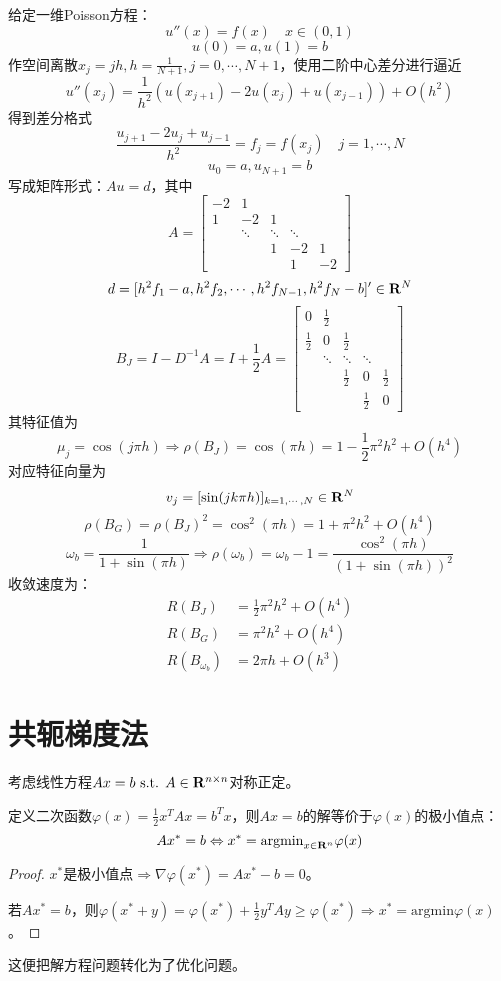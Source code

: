 \documentclass{ctexart}
\begin{document}
\begin{Eg}[一维Poisson方程边值问题的差分格式]
给定一维Poisson方程：
\[u''(x)=f(x)\quad x\in (0,1)\]
\[u(0)=a,u(1)=b\]
作空间离散$x_j=jh,h=\frac{1}{N+1},j=0,\cdots, N+1$，使用二阶中心差分进行逼近
\[u''(x_j)=\frac{1}{h^2}(u(x_{j+1})-2u(x_j)+u(x_{j-1}))+O(h^2)\]
得到差分格式
\[\frac{u_{j+1}-2u_j+u_{j-1}}{h^2}=f_j=f(x_j)\quad j=1,\cdots,N\]
\[u_0=a, u_{N+1}=b\]
写成矩阵形式：$Au=d$，其中
\[A=
\begin{bmatrix}
-2&1&&&\\
1&-2&1&&\\
&\ddots&\ddots&\ddots&\\
&&1&-2&1\\
&&&1&-2
\end{bmatrix}
\]
\[d=[h^2f_1-a,h^2f_2,\cdots, h^2f_{N-1},h^2f_N-b]'\in\mathbf{R}^N\]
\[B_J=I-D^{-1}A=I+\frac{1}{2}A=
\begin{bmatrix}
0&\frac{1}{2}&&&\\
\frac{1}{2}&0&\frac{1}{2}&&\\
&\ddots&\ddots&\ddots&\\
&&\frac{1}{2}&0&\frac{1}{2}\\
&&&\frac{1}{2}&0
\end{bmatrix}
\]
其特征值为
\[\mu_j=\cos(j\pi h)\Rightarrow \rho(B_J)=\cos(\pi h)=1-\frac{1}{2}\pi^2h^2+O(h^4)\]
对应特征向量为
\[v_j=[\sin(jk\pi h)]_{k=1,\cdots,N}\in \mathbf{R}^N\]
\[\rho(B_G)=\rho(B_J)^2=\cos^2(\pi h)=1+\pi^2h^2+O(h^4)\]
\[\omega_b=\frac{1}{1+\sin(\pi h)}\Rightarrow \rho(\omega_b)=\omega_b-1=\frac{\cos^2(\pi h)}{(1+\sin(\pi h))^2}\]
收敛速度为：
\begin{align*}
R(B_J)&=\frac{1}{2}\pi^2h^2+O(h^4)\\
R(B_G)&=\pi^2h^2+O(h^4)\\
R(B_{\omega_b})&=2\pi h+O(h^3)
\end{align*}
\end{Eg}


\section{共轭梯度法}
考虑线性方程$Ax=b\text{ s.t. } A\in \mathbf{R}^{n\times n}$对称正定。
\begin{Thm}
定义二次函数$\varphi(x)=\frac{1}{2}x^TAx=b^T x$，则$Ax=b$的解等价于$\varphi(x)$的极小值点：
\[Ax^*=b\Leftrightarrow x^*=\mathrm{argmin}_{x\in \mathbf{R}^n}\varphi(x)\]
\end{Thm}
\begin{proof}
$x^*$是极小值点$\Rightarrow \nabla \varphi(x^*)=Ax^*-b=0$。

若$Ax^*=b$，则$\varphi(x^*+y)=\varphi(x^*)+\frac{1}{2}y^TAy\geq \varphi(x^*)\Rightarrow x^*=\mathrm{argmin}\varphi(x)$。
\end{proof}
这便把解方程问题转化为了优化问题。
\end{document}
